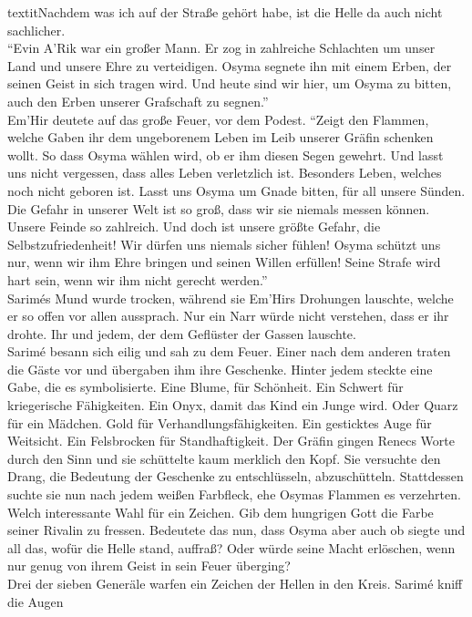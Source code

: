 textit{Nachdem was ich auf der Straße gehört habe, ist die Helle da auch nicht sachlicher.}\\
``Evin A'Rik war ein großer Mann. Er zog in zahlreiche Schlachten um unser Land und unsere Ehre 
zu verteidigen. Osyma segnete ihn mit einem Erben, der seinen Geist in sich tragen wird. Und heute 
sind wir hier, um Osyma zu bitten, auch den Erben unserer Grafschaft zu segnen.''\\
Em'Hir deutete auf das große Feuer, vor dem Podest. ``Zeigt den Flammen, welche Gaben ihr dem 
ungeborenem Leben im Leib unserer Gräfin schenken wollt. So dass Osyma wählen wird, ob er ihm 
diesen Segen gewehrt. Und lasst uns nicht vergessen, dass alles Leben verletzlich ist. Besonders 
Leben, welches noch nicht geboren ist. Lasst uns Osyma um Gnade bitten, für all unsere Sünden. 
Die Gefahr in unserer Welt ist so groß, dass wir sie niemals messen können. Unsere Feinde so 
zahlreich. Und doch ist unsere größte Gefahr, die Selbstzufriedenheit! Wir dürfen uns niemals 
sicher fühlen! Osyma schützt uns nur, wenn wir ihm Ehre bringen und seinen Willen erfüllen! 
Seine Strafe wird hart sein, wenn wir ihm nicht gerecht werden.''\\
Sarimés Mund wurde trocken, während sie Em'Hirs Drohungen lauschte, welche er so offen vor allen 
aussprach. Nur ein Narr würde nicht verstehen, dass er ihr drohte. Ihr und jedem, der dem 
Geflüster der Gassen lauschte. \\
Sarimé besann sich eilig und sah zu dem Feuer. Einer nach dem anderen traten die Gäste vor und 
übergaben ihm ihre Geschenke. Hinter jedem steckte eine Gabe, die es symbolisierte. Eine Blume, für 
Schönheit. Ein Schwert für kriegerische Fähigkeiten. Ein Onyx, damit das Kind ein Junge wird. Oder 
Quarz für ein Mädchen. Gold für Verhandlungsfähigkeiten. Ein gesticktes Auge für Weitsicht. Ein 
Felsbrocken für Standhaftigkeit. Der Gräfin gingen Renecs Worte durch den Sinn und sie schüttelte 
kaum merklich den Kopf. Sie versuchte den Drang, die Bedeutung der Geschenke zu entschlüsseln, 
abzuschütteln. Stattdessen suchte sie nun nach jedem weißen Farbfleck, ehe Osymas Flammen es 
verzehrten. Welch interessante Wahl für ein Zeichen. Gib dem hungrigen Gott die Farbe seiner 
Rivalin zu fressen. Bedeutete das nun, dass Osyma aber auch ob siegte und all das, wofür die Helle 
stand, auffraß? Oder würde seine Macht erlöschen, wenn nur genug von ihrem Geist in sein Feuer 
überging?\\
Drei der sieben Generäle warfen ein Zeichen der Hellen in den Kreis. Sarimé kniff die Augen 
